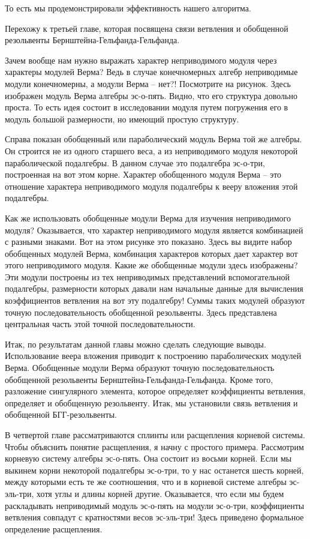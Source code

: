 \documentclass{article}
\theoremstyle{definition} \newtheorem{Def}{Определение}
\begin{document}
То есть мы продемонстрировали эффективность нашего алгоритма.

Перехожу к третьей главе, которая посвящена связи ветвления и обобщенной резольвенты Бернштейна-Гельфанда-Гельфанда. 

Зачем вообще нам нужно выражать характер неприводимого модуля через характеры модулей Верма? Ведь в случае конечномерных алгебр неприводимые модули конечномерны, а модули Верма -- нет?! Посмотрите на рисунок. Здесь изображен модуль Верма алгебры эс-о-пять. Видно, что его структура довольно проста. То есть идея состоит в исследовании модуля путем погружения его в модуль большой размерности, но имеющий простую структуру.

Справа показан обобщенный или параболический модуль Верма той же алгебры. Он строится не из одного старшего веса, а из неприводимого модуля некоторой параболической подалгебры.  В данном случае это подалгебра эс-о-три, построенная на вот этом корне.  Характер обобщенного модуля Верма -- это отношение характера неприводимого модуля подалгебры к вееру вложения этой подалгебры.

Как же использовать обобщенные модули Верма для изучения неприводимого модуля? Оказывается, что характер неприводимого модуля является комбинацией с разными знаками. Вот на этом рисунке это показано. Здесь вы видите набор обобщенных модулей Верма, комбинация характеров которых дает характер вот этого неприводимого модуля. Какие же обобщенные модули здесь изображены? Эти модули построены из тех неприводимых представлений вспомогательной подалгебры, размерности которых давали нам начальные данные для вычисления коэффициентов ветвления на вот эту подалгебру!
Суммы таких модулей образуют точную последовательность обобщенной резольвенты. Здесь представлена центральная часть этой точной последовательности. 

Итак, по результатам данной главы можно сделать следующие выводы. Использование веера вложения приводит к построению параболических модулей Верма. Обобщенные модули Верма образуют точную последовательность обобщенной резольвенты Бернштейна-Гельфанда-Гельфанда. Кроме того, разложение сингулярного элемента, которое определяет коэффициенты ветвления, определяет и обобщенную резольвенту. Итак, мы установили связь ветвления и обобщенной БГГ-резольвенты.

В четвертой главе рассматриваются сплинты или расщепления корневой системы. Чтобы объяснить понятие расщепления, я начну с простого примера. Рассмотрим корневую систему алгебры эс-о-пять. Она состоит из восьми корней. Если мы выкинем корни некоторой подалгебры эс-о-три, то у нас останется шесть корней, между которыми есть те же соотношения, что и в корневой системе алгебры эс-эль-три, хотя углы и длины корней другие. Оказывается, что если мы будем раскладывать неприводимый модуль эс-о-пять на модули эс-о-три, коэффициенты ветвления совпадут с кратностями весов эс-эль-три!
Здесь приведено формальное определение расщепления. 
\end{document}
